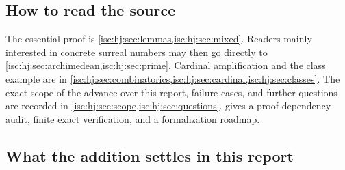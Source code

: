 \documentclass[11pt,letterpaper]{article}
\theoremstyle{definition}
\theoremstyle{remark}
\numberwithin{equation}{section}
\begin{document}
\subsection{How to read the source}

The essential proof is \cref{isc:hj:sec:lemmas,isc:hj:sec:mixed}. Readers
mainly interested in concrete surreal numbers may then go directly to
\cref{isc:hj:sec:archimedean,isc:hj:sec:prime}. Cardinal amplification and
the class example are in
\cref{isc:hj:sec:combinatorics,isc:hj:sec:cardinal,isc:hj:sec:classes}.
The exact scope of the advance over this report, failure cases, and
further questions are recorded in
\cref{isc:hj:sec:scope,isc:hj:sec:questions}. 
gives a proof-dependency audit, finite exact verification, and a
formalization roadmap.

\subsection{What the addition settles in this report}
\label{isc:hj:sec:answers}
\end{document}
